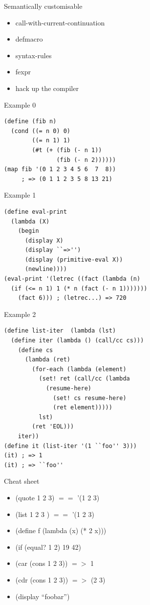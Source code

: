 \documentclass[20pt]{beamer}
\begin{document}
\begin{frame}{Semantically customisable}
  \begin{itemize}
  \item call-with-current-continuation
  \item defmacro
  \item syntax-rules
  \item fexpr
  \item hack up the compiler
  \end{itemize}
\end{frame}

\begin{frame}[fragile]{Example 0}
  \begin{lstlisting}
(define (fib n)
  (cond ((= n 0) 0)
        ((= n 1) 1)
        (#t (+ (fib (- n 1))
               (fib (- n 2))))))
(map fib '(0 1 2 3 4 5 6  7  8))
     ; => (0 1 1 2 3 5 8 13 21)
  \end{lstlisting}
\end{frame}

\begin{frame}[fragile]{Example 1}
  \begin{lstlisting}
(define eval-print
  (lambda (X)
    (begin
      (display X)
      (display ``=>'')
      (display (primitive-eval X))
      (newline))))
(eval-print '(letrec ((fact (lambda (n)
  (if (<= n 1) 1 (* n (fact (- n 1)))))))
    (fact 6))) ; (letrec...) => 720
  \end{lstlisting}
\end{frame}

\begin{frame}[fragile]{Example 2}
  \begin{lstlisting}
(define list-iter  (lambda (lst)
  (define iter (lambda () (call/cc cs)))
    (define cs
      (lambda (ret)
        (for-each (lambda (element)
          (set! ret (call/cc (lambda
            (resume-here)
              (set! cs resume-here)
              (ret element)))))
          lst)
        (ret 'EOL)))
    iter))
(define it (list-iter '(1 ``foo'' 3)))
(it) ; => 1
(it) ; => ``foo''
  \end{lstlisting}
\end{frame}

\begin{frame}{Cheat sheet}
  \begin{itemize}
  \item (quote 1 2 3) $==$ '(1 2 3)
  \item (list 1 2 3 ) $==$ '(1 2 3)
  \item (define f (lambda (x) (* 2 x)))
  \item (if (equal? 1 2) 19 42)
  \item (car (cons 1 2 3)) $=>$ 1
  \item (cdr (cons 1 2 3)) $=>$ (2 3)
  \item (display ``foobar'')
  \end{itemize}
\end{frame}
\end{document}
